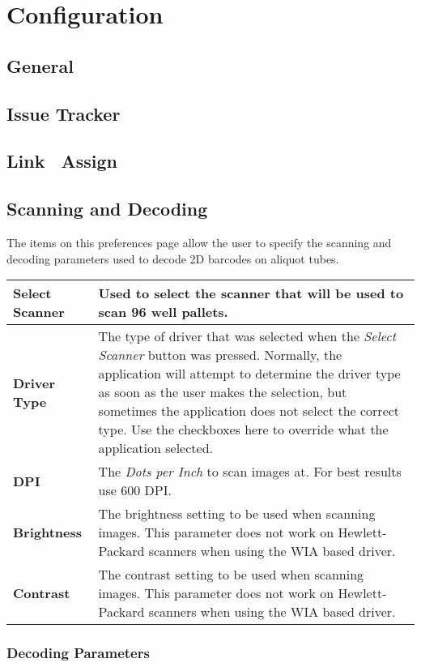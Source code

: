 \chapter{Configuration}
\section{General}
\section{Issue Tracker}
\section{Link \ Assign}
\section{Scanning and Decoding}
The items on this preferences page allow the user to specify the scanning and
decoding parameters used to decode 2D barcodes on aliquot tubes.
\begin{center}
\begin{tabular}{|l|p{5in}|}
  \hline
  \textbf{Select Scanner} & Used to select the scanner that will be used to scan
    96 well pallets.\\
  \hline
  \textbf{Driver Type} & The type of driver that was selected when the \emph{Select
    Scanner} button was pressed. Normally, the application will attempt to
    determine the driver type as soon as the user makes the selection, but
    sometimes the application does not select the correct type. Use the
    checkboxes here to override what the application selected.\\
  \hline
  \textbf{DPI} & The \emph{Dots per Inch} to scan images at. For best results use
    600 DPI.\\
  \hline
  \textbf{Brightness} & The brightness setting to be used when scanning
    images. This parameter does not work on Hewlett-Packard scanners when using
    the WIA based driver.\\
  \hline
  \textbf{Contrast} & The contrast setting to be used when scanning
    images. This parameter does not work on Hewlett-Packard scanners when using
    the WIA based driver.\\
  \hline
\end{tabular}
\end{center}
\subsection{Decoding Parameters}

